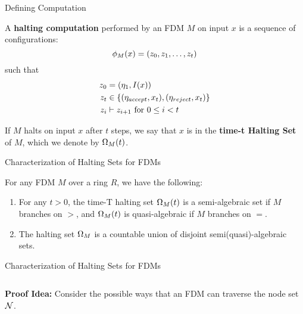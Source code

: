 \documentclass[c]{beamer}
\begin{document}
\begin{frame}{Defining Computation}

  A \textbf{halting computation} performed by an FDM $M$ on input $x$
  is a sequence of configurations: 
  $$\phi_M(x) = (z_0, z_1, \ldots, z_t)$$ such that
  \begin{align*}
    z_0 &= (\eta_1, I(x))\\
    z_t &\in \{(\eta_{accept}, x_t), (\eta_{reject}, x_t)\}\\
    z_i &\vdash z_{i+1} \text{ for } 0 \leq i < t
  \end{align*}\pause
  
  If $M$ halts on input $x$ after $t$ steps, we say that $x$ is in the
  \textbf{time-t Halting Set} of $M$, which we denote by
  $\Omega_M(t)$.

\end{frame}

\begin{frame}{Characterization of Halting Sets for FDMs}

  \begin{theorem}
    
    For any FDM $M$ over a ring $R$, we have the following:

    \begin{enumerate}
    \item For any $t > 0$, the time-T halting set $\Omega_M(t)$ is a
      semi-algebraic set if $M$ branches on $>$, and $\Omega_M(t)$
      is quasi-algebraic if $M$ branches on $=$.

    \item The halting set $\Omega_M$ is a countable union of
      disjoint semi(quasi)-algebraic sets.

    \end{enumerate}
  \end{theorem}
\end{frame}

\begin{frame}{Characterization of Halting Sets for FDMs}

    \begin{columns}
      
      \textbf{Proof Idea:} Consider the possible ways that an FDM can
      traverse the node set $\mathcal{N}$.
      
      \scaletopagewidth[.9]{\mandelrecfull{}}
    \end{columns}
    
\end{frame}
\end{document}
